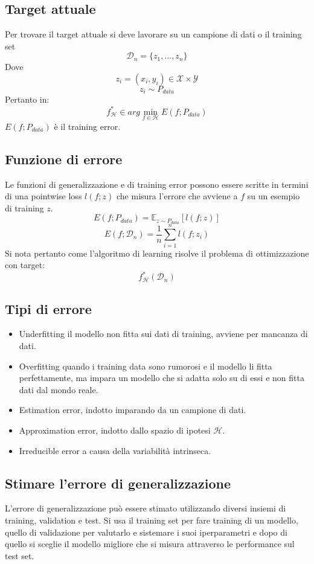 	\subsection{Target attuale}
	Per trovare il target attuale si deve lavorare su un campione di dati o il training set
	$$\mathcal{D}_n=\{z_1,\dots,z_n\}$$
	Dove
	$$z_i=(x_i,y_i)\in\mathcal{X}\times\mathcal{Y}$$
	$$z_i\sim P_{data}$$
	Pertanto in:
	$$f^*_{\mathcal{H}}\in arg\min\limits_{f\in\mathcal{H}} E(f;P_{data})$$
	$E(f;P_{data})$ \`e il training error.

	\subsection{Funzione di errore}
	Le funzioni di generalizzazione e di training error possono essere scritte in termini di una pointwise loss $l(f;z)$ che misura l'errore che avviene a $f$ su un esempio di training $z$.
	$$E(f;P_{data})=\mathbb{E}_{z\sim P_{data}}[l(f;z)]$$
	$$E(f;\mathcal{D}_n)=\dfrac{1}{n}\sum\limits_{i=1}^nl(f;z_i)$$
	Si nota pertanto come l'algoritmo di learning risolve il problema di ottimizzazione con target:
	$$f^*_\mathcal{H}(\mathcal{D}_n)$$

	\subsection{Tipi di errore}
	\begin{multicols}{2}
		\begin{itemize}
			\item Underfitting il modello non fitta sui dati di training, avviene per mancanza di dati.
			\item Overfitting quando i training data sono rumorosi e il modello li fitta perfettamente, ma impara un modello che si adatta solo su di essi e non fitta dati dal mondo reale.
			\item Estimation error, indotto imparando da un campione di dati.
			\item Approximation error, indotto dallo spazio di ipotesi $\mathcal{H}$.
			\item Irreducible error a causa della variabilit\`a intrinseca.
		\end{itemize}
	\end{multicols}

	\subsection{Stimare l'errore di generalizzazione}
	L'errore di generalizzazione pu\`o essere stimato utilizzando diversi insiemi di training, validation e test.
	Si usa il training set per fare training di un modello, quello di validazione per valutarlo e sistemare i suoi iperparametri e dopo di quello si sceglie il modello migliore che si misura attraverso le performance sul test set.

